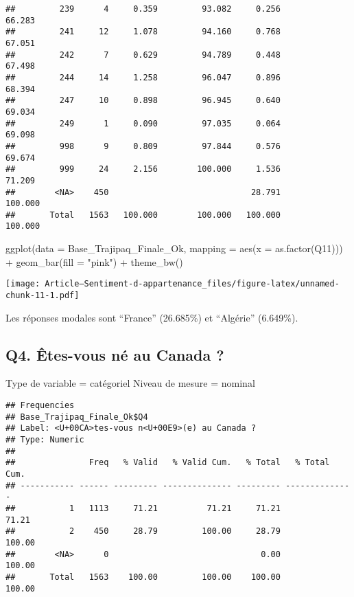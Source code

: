 \documentclass[
]{article}
\newenvironment{Shaded}{\begin{snugshade}}{\end{snugshade}}
\newcommand{\AttributeTok}[1]{\textcolor[rgb]{0.77,0.63,0.00}{#1}}
\newcommand{\FunctionTok}[1]{\textcolor[rgb]{0.00,0.00,0.00}{#1}}
\newcommand{\NormalTok}[1]{#1}
\newcommand{\SpecialCharTok}[1]{\textcolor[rgb]{0.00,0.00,0.00}{#1}}
\newcommand{\StringTok}[1]{\textcolor[rgb]{0.31,0.60,0.02}{#1}}
\begin{document}
\begin{verbatim}
##         239      4     0.359         93.082     0.256         66.283
##         241     12     1.078         94.160     0.768         67.051
##         242      7     0.629         94.789     0.448         67.498
##         244     14     1.258         96.047     0.896         68.394
##         247     10     0.898         96.945     0.640         69.034
##         249      1     0.090         97.035     0.064         69.098
##         998      9     0.809         97.844     0.576         69.674
##         999     24     2.156        100.000     1.536         71.209
##        <NA>    450                             28.791        100.000
##       Total   1563   100.000        100.000   100.000        100.000
\end{verbatim}

\begin{Shaded}
\begin{Highlighting}[]
\FunctionTok{ggplot}\NormalTok{(}\AttributeTok{data =}\NormalTok{ Base\_Trajipaq\_Finale\_Ok, }\AttributeTok{mapping =} \FunctionTok{aes}\NormalTok{(}\AttributeTok{x =} \FunctionTok{as.factor}\NormalTok{(Q11))) }\SpecialCharTok{+}
  \FunctionTok{geom\_bar}\NormalTok{(}\AttributeTok{fill =} \StringTok{"pink"}\NormalTok{) }\SpecialCharTok{+}
  \FunctionTok{theme\_bw}\NormalTok{()}
\end{Highlighting}
\end{Shaded}

\texttt{[image: Article---Sentiment-d-appartenance\_files/figure-latex/unnamed-chunk-11-1.pdf]}

Les réponses modales sont ``France'' (26.685\%) et ``Algérie''
(6.649\%).

\hypertarget{q4.-uxeates-vous-nuxe9-au-canada}{%
\subsection{Q4. Êtes-vous né au Canada
?}\label{q4.-uxeates-vous-nuxe9-au-canada}}

Type de variable = catégoriel Niveau de mesure = nominal

\begin{Shaded}
\end{Shaded}

\begin{verbatim}
## Frequencies  
## Base_Trajipaq_Finale_Ok$Q4  
## Label: <U+00CA>tes-vous n<U+00E9>(e) au Canada ?  
## Type: Numeric  
## 
##               Freq   % Valid   % Valid Cum.   % Total   % Total Cum.
## ----------- ------ --------- -------------- --------- --------------
##           1   1113     71.21          71.21     71.21          71.21
##           2    450     28.79         100.00     28.79         100.00
##        <NA>      0                               0.00         100.00
##       Total   1563    100.00         100.00    100.00         100.00
\end{verbatim}
\end{document}
